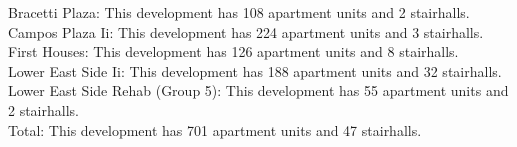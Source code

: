 {Bracetti Plaza}: This development has 108 apartment units and 2 stairhalls.\\{Campos Plaza Ii}: This development has 224 apartment units and 3 stairhalls.\\{First Houses}: This development has 126 apartment units and 8 stairhalls.\\{Lower East Side Ii}: This development has 188 apartment units and 32 stairhalls.\\{Lower East Side Rehab (Group 5)}: This development has 55 apartment units and 2 stairhalls.\\{Total}: This development has 701 apartment units and 47 stairhalls.\\